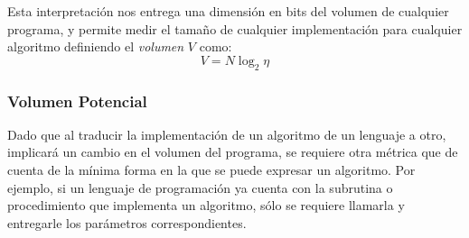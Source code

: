 \documentclass[letterpaper,12pt]{article}
\begin{document}
Esta interpretación nos entrega una dimensión en bits del volumen de cualquier programa, y permite medir el tamaño de cualquier implementación para cualquier algoritmo definiendo el \textit{volumen} $V$ como:
\begin{equation}
  V = N\log_{2}\eta
\end{equation}
\subsubsection{Volumen Potencial}

Dado que al traducir la implementación de un algoritmo de un lenguaje a otro, implicará un cambio en el volumen del programa, se requiere otra métrica que de cuenta de la mínima forma en la que se puede expresar un algoritmo. Por ejemplo, si un lenguaje de programación ya cuenta con la subrutina o procedimiento que implementa un algoritmo, sólo se requiere llamarla y entregarle los parámetros correspondientes.
\end{document}
